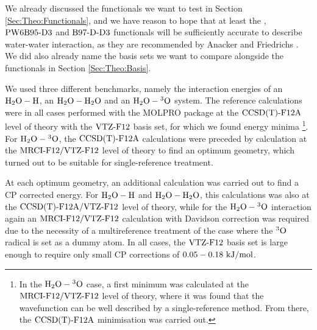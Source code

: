 \documentclass[8.5pt,twoside,twocolumn]{article}
\newcommand\kmo{\enmat{\te {kJ/mol}}}
\theoremstyle{standard}
\begin{document}
We already
discussed the functionals we want to test in Section \ref{Sec:Theo:Functionals}, and we
have reason to hope that at least the \pbez, $\text{PW6B95}\text{-D3}$ and $\text{B97-D}\text{-D3}$ functionals will be sufficiently
accurate to describe water-water interaction, as they are recommended by Anacker and Friedrichs \cite{Anacker2014}.
We did also already name the basis sets we want to compare alongside the functionals in Section \ref{Sec:Theo:Basis}.

We used three different benchmarks, namely the interaction energies of an $\mbox{\ensuremath{\text H _2 \text O-\text H}}$, an $\mbox{\ensuremath{\text H _2 \text O-\text H _2 \text O}}$ and an $\mbox{\ensuremath{\text H _2 \text O-\hspace{.2pt} ^3\text{O}}}$ system.
The reference calculations were in all cases performed with the MOLPRO \cite{MOLPRO_brief} package
at the $\text{CCSD(T)-F12A}$ \cite{CCSDTF12} level of theory with the $\text{VTZ-F}12$\cite{VTZ} basis set, for
which we found energy minima \footnote{In the $\mbox{\ensuremath{\text H _2 \text O-\hspace{.2pt} ^3\text{O}}}$ case, a first minimum was calculated at the
$\text{MRCI-F12}/\text{VTZ-F}12$ \cite{MRCIF12} level of theory, where it was found that the wavefunction can be well
described by a single-reference method. From there, the $\text{CCSD(T)-F12A}$ minimisation was carried out.}.
For $\mbox{\ensuremath{\text H _2 \text O-\hspace{.2pt} ^3\text{O}}}$, the $\text{CCSD(T)-F12A}$ calculations were preceded by \cite{Multiref} calculation
at the $\text{MRCI-F12}/\text{VTZ-F}12$ level of theory to find an optimum geometry, which turned out to be
suitable for single-reference treatment.

At each optimum geometry, an additional calculation was carried out to find a CP
corrected energy. For $\mbox{\ensuremath{\text H _2 \text O-\text H}}$ and $\mbox{\ensuremath{\text H _2 \text O-\text H _2 \text O}}$, this calculations was also at the $\text{CCSD(T)-F12A}/\text{VTZ-F}12$ level
of theory, while for the $\mbox{\ensuremath{\text H _2 \text O-\hspace{.2pt} ^3\text{O}}}$ interaction again an $\text{MRCI-F12}/\text{VTZ-F}12$ calculation with
Davidson correction\cite{DavidsonCorrection} was
required due to the necessity of a multireference treatment of the case where the
$^3\text O$ radical is set as a dummy atom. In all cases, the $\text{VTZ-F}12$ basis set is 
large enough to require only small CP corrections of $0.05 - 0.18 \ \kmo$. 
\end{document}
